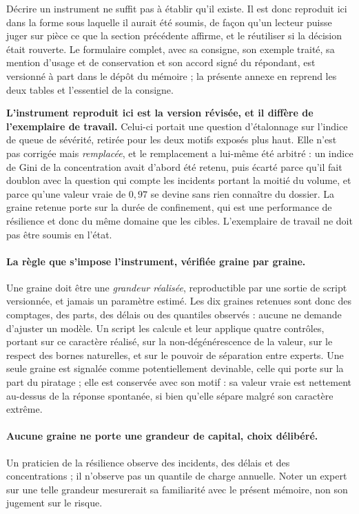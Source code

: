 Décrire un instrument ne suffit pas à établir qu'il existe. Il est donc reproduit ici dans la
forme sous laquelle il aurait été soumis, de façon qu'un lecteur puisse juger sur pièce ce que
la section précédente affirme, et le réutiliser si la décision était rouverte. Le formulaire
complet, avec sa consigne, son exemple traité, sa mention d'usage et de conservation et son
accord signé du répondant, est versionné à part dans le dépôt du mémoire ; la présente annexe en
reprend les deux tables et l'essentiel de la consigne.

\begin{attention}
\textbf{L'instrument reproduit ici est la version révisée, et il diffère de l'exemplaire de
travail.} Celui-ci portait une question d'étalonnage sur l'indice de queue de sévérité, retirée
pour les deux motifs exposés plus haut. Elle n'est pas corrigée mais \emph{remplacée}, et le
remplacement a lui-même été arbitré : un indice de Gini de la concentration avait d'abord été
retenu, puis écarté parce qu'il fait doublon avec la question qui compte les incidents portant la
moitié du volume, et parce qu'une valeur vraie de $0{,}97$ se devine sans rien connaître du
dossier. La graine retenue porte sur la durée de confinement, qui est une performance de
résilience et donc du même domaine que les cibles. L'exemplaire de travail ne doit pas
être soumis en l'état.
\end{attention}

\paragraph{La règle que s'impose l'instrument, vérifiée graine par graine.} Une graine doit être une
\emph{grandeur réalisée}, reproductible par une sortie de script versionnée, et jamais un
paramètre estimé. Les dix graines retenues sont donc des comptages, des parts, des délais ou des
quantiles observés : aucune ne demande d'ajuster un modèle. Un script les calcule et leur applique
quatre contrôles, portant sur ce caractère réalisé, sur la non-dégénérescence de la valeur, sur le
respect des bornes naturelles, et sur le pouvoir de séparation entre experts. Une seule graine est
signalée comme potentiellement devinable, celle qui porte sur la part du piratage ; elle est
conservée avec son motif : sa valeur vraie est nettement au-dessus de la réponse spontanée, si
bien qu'elle sépare malgré son caractère extrême.

\paragraph{Aucune graine ne porte une grandeur de capital, choix délibéré.} Un praticien de la
résilience observe des incidents, des délais et des concentrations ; il n'observe pas un quantile
de charge annuelle. Noter un expert sur une telle grandeur mesurerait sa familiarité avec le
présent mémoire, non son jugement sur le risque.

